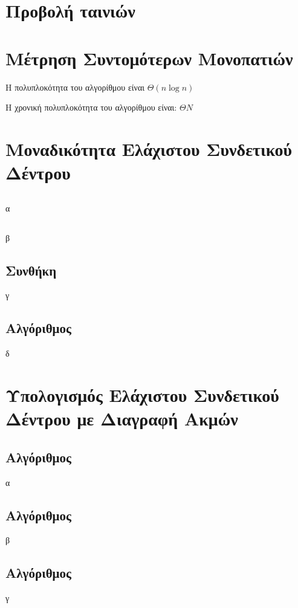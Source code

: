 \documentclass[a4paper,10pt]{article} \usepackage{anysize}
\begin{document}
\def\thesubsection {\alph{subsection}}
\renewcommand{\labelenumi}{\roman{enumi})}
\renewcommand{\labelenumii}{(\arabic{enumii})}



\section{Προβολή ταινιών} \setcounter{section}{1}

\section{Μέτρηση Συντομότερων Μονοπατιών}
Η πολυπλοκότητα του αλγορίθμου είναι $\Theta(n\log{n})$



Η χρονική πολυπλοκότητα του αλγορίθμου είναι: $\Theta{N}$


\section{Μοναδικότητα Ελάχιστου Συνδετικού Δέντρου}
\subsection{}
α
\subsection{}
β
\subsection{Συνθήκη}
γ
\subsection{Αλγόριθμος}
δ


\section{Υπολογισμός Ελάχιστου Συνδετικού Δέντρου με Διαγραφή Ακμών}
\subsection{Αλγόριθμος}
α
\subsection{Αλγόριθμος}
β
\subsection{Αλγόριθμος}
γ

\end{document}
